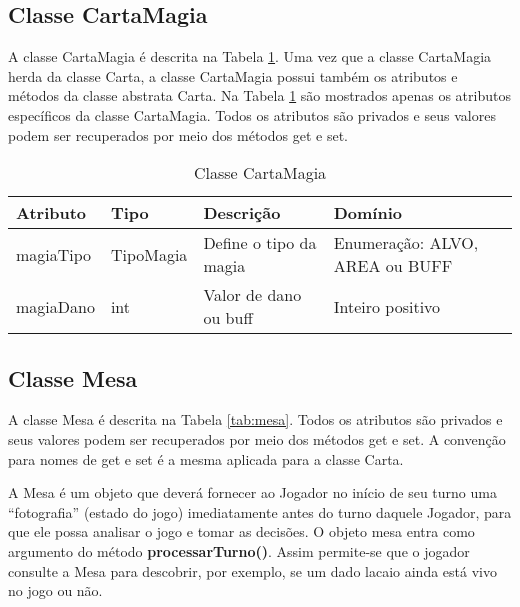 \documentclass[10pt]{article}
\begin{document}
\subsection{Classe CartaMagia}

A classe CartaMagia é descrita na Tabela \ref{tab:cartaMagia}. Uma vez que a classe CartaMagia herda da classe Carta, a classe CartaMagia possui também os atributos e métodos da classe abstrata Carta. Na Tabela \ref{tab:cartaMagia} são mostrados apenas os atributos específicos da classe CartaMagia. Todos os atributos são privados e seus valores podem ser recuperados por meio dos métodos get e set. 

\renewcommand{\arraystretch}{1.15}
\begin{table}[h]
\centering
\caption{Classe CartaMagia}
\label{tab:cartaMagia}
\begin{tabular}{|l|l|p{5cm}|p{4cm}|}
\hline
Atributo & Tipo & Descrição & Domínio \\ \hline
magiaTipo & TipoMagia & Define o tipo da magia & Enumeração: ALVO, AREA ou BUFF \\ \hline
magiaDano & int       & Valor de dano ou buff  & Inteiro positivo \\ \hline
\end{tabular}
\end{table}

\subsection{Classe Mesa}

A classe Mesa é descrita na Tabela \ref{tab:mesa}. Todos os atributos são privados e seus valores podem ser recuperados por meio dos métodos get e set. A convenção para nomes de get e set é a mesma aplicada para a classe Carta.

A Mesa é um objeto que deverá fornecer ao Jogador no início de seu turno uma ``fotografia'' (estado do jogo) imediatamente antes do turno daquele Jogador, para que ele possa analisar o jogo e tomar as decisões. O objeto mesa entra como argumento do método \textbf{processarTurno()}. Assim permite-se que o jogador consulte a Mesa para descobrir, por exemplo, se um dado lacaio ainda está vivo no jogo ou não.
\end{document}
